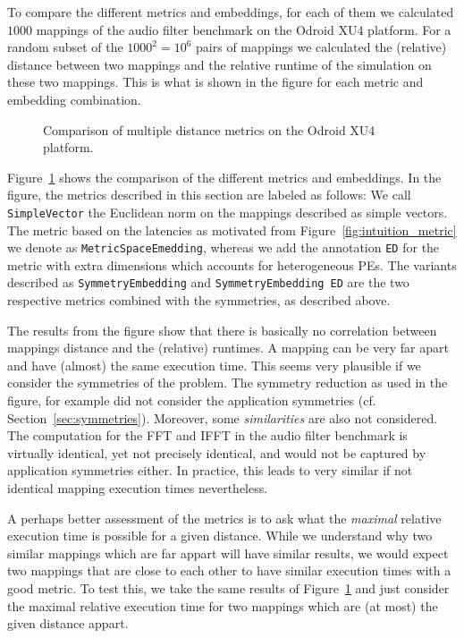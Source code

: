 To compare the different metrics and embeddings, for each of them we calculated $1000$ mappings of the audio filter benchmark on the Odroid XU4 platform. 
For a random subset of the $1000^2 = 10^6$ pairs of mappings we calculated the (relative) distance between two mappings and the relative runtime of the simulation on these two mappings.
This is what is shown in the figure for each metric and embedding combination. 

\begin{figure}[h]
	\centering
	\caption{Comparison of multiple distance metrics on the Odroid XU4 platform.}
	\label{fig:metric_comparison_exynos}
\end{figure}

Figure~\ref{fig:metric_comparison_exynos} shows the comparison of the different metrics and embeddings.
In the figure, the metrics described in this section are labeled as follows: We call \texttt{SimpleVector} the Euclidean norm on the mappings described as simple vectors. 
The metric based on the latencies as motivated from Figure~\ref{fig:intuition_metric} we denote as \texttt{MetricSpaceEmedding}, whereas we add the annotation \texttt{ED} for the metric with extra dimensions which accounts for heterogeneous \acp{PE}.
The variants described as \texttt{SymmetryEmbedding} and \texttt{SymmetryEmbedding ED} are the two respective metrics combined with the symmetries, as described above. 

The results from the figure show that there is basically no correlation between mappings distance and the (relative) runtimes.
A mapping can be very far apart and have (almost) the same execution time. 
This seems very plausible if we consider the symmetries of the problem.
The symmetry reduction as used in the figure, for example did not consider the application symmetries (cf. Section~\ref{sec:symmetries}).
Moreover, some \emph{similarities} are also not considered.
The computation for the \ac{FFT} and \ac{IFFT} in the audio filter benchmark is virtually identical, yet not precisely identical, and would not be captured by application symmetries either.
In practice, this leads to very similar if not identical mapping execution times nevertheless.

A perhaps better assessment of the metrics is to ask what the \emph{maximal} relative execution time is possible for a given distance.
While we understand why two similar mappings which are far appart will have similar results, we would expect two mappings that are close to each other to have similar execution times with a good metric.
To test this, we take the same results of Figure~\ref{fig:metric_comparison_exynos} and just consider the maximal relative execution time for two mappings which are (at most) the given distance appart.

